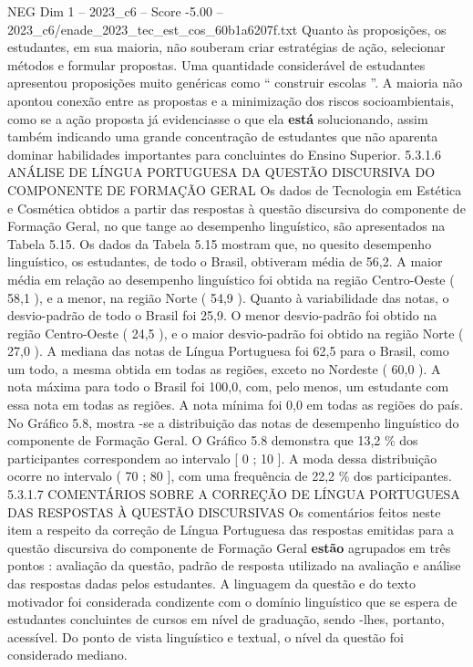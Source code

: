 \begin{textsample}{NEG Dim 1 – 2023\_c6 – Score -5.00 – 2023\_c6/enade\_2023\_tec\_est\_cos\_60b1a6207f.txt}
Quanto às proposições, os estudantes, em sua maioria, não souberam criar estratégias de ação, selecionar métodos e formular propostas.
Uma quantidade considerável de estudantes apresentou proposições muito genéricas como “ construir escolas ”.
A maioria não apontou conexão entre as propostas e a minimização dos riscos socioambientais, como se a ação proposta já evidenciasse o que ela \textbf{está} solucionando, assim também indicando uma grande concentração de estudantes que não aparenta dominar habilidades importantes para concluintes do Ensino Superior. 5.3.1.6 ANÁLISE DE LÍNGUA PORTUGUESA DA QUESTÃO DISCURSIVA DO COMPONENTE DE FORMAÇÃO GERAL Os dados de Tecnologia em Estética e Cosmética obtidos a partir das respostas à questão discursiva do componente de Formação Geral, no que tange ao desempenho linguístico, são apresentados na Tabela 5.15.
Os dados da Tabela 5.15 mostram que, no quesito desempenho linguístico, os estudantes, de todo o Brasil, obtiveram média de 56,2.
A maior média em relação ao desempenho linguístico foi obtida na região Centro-Oeste ( 58,1 ), e a menor, na região Norte ( 54,9 ).
Quanto à variabilidade das notas, o desvio-padrão de todo o Brasil foi 25,9.
O menor desvio-padrão foi obtido na região Centro-Oeste ( 24,5 ), e o maior desvio-padrão foi obtido na região Norte ( 27,0 ).
A mediana das notas de Língua Portuguesa foi 62,5 para o Brasil, como um todo, a mesma obtida em todas as regiões, exceto no Nordeste ( 60,0 ).
A nota máxima para todo o Brasil foi 100,0, com, pelo menos, um estudante com essa nota em todas as regiões.
A nota mínima foi 0,0 em todas as regiões do país.
No Gráfico 5.8, mostra -se a distribuição das notas de desempenho linguístico do componente de Formação Geral.
O Gráfico 5.8 demonstra que 13,2 \% dos participantes correspondem ao intervalo [ 0 ; 10 ].
A moda dessa distribuição ocorre no intervalo ( 70 ; 80 ], com uma frequência de 22,2 \% dos participantes. 5.3.1.7 COMENTÁRIOS SOBRE A CORREÇÃO DE LÍNGUA PORTUGUESA DAS RESPOSTAS À QUESTÃO DISCURSIVAS Os comentários feitos neste item a respeito da correção de Língua Portuguesa das respostas emitidas para a questão discursiva do componente de Formação Geral \textbf{estão} agrupados em três pontos : avaliação da questão, padrão de resposta utilizado na avaliação e análise das respostas dadas pelos estudantes.
A linguagem da questão e do texto motivador foi considerada condizente com o domínio linguístico que se espera de estudantes concluintes de cursos em nível de graduação, sendo -lhes, portanto, acessível.
Do ponto de vista linguístico e textual, o nível da questão foi considerado mediano.

\end{textsample}
